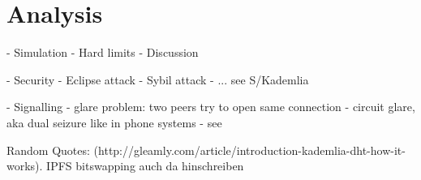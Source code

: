 \chapter{Analysis}
- Simulation
- Hard limits
- Discussion

- Security
    - Eclipse attack
    - Sybil attack
    - ... see S/Kademlia

- Signalling
    - glare problem: two peers try to open same connection
        - circuit glare, aka dual seizure like in phone systems
        - see \cite[pp. 194-194]{signaling-systems-book}


Random Quotes:
(http://gleamly.com/article/introduction-kademlia-dht-how-it-works). IPFS bitswapping auch da hinschreiben
